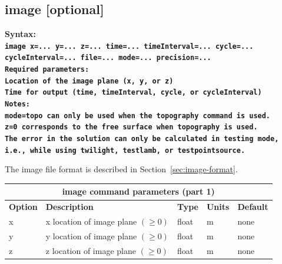 \documentclass[11pt]{report}
\begin{document}
\subsection{image [optional]}
\label{keyword:image}
\begin{flushleft}
\bf Syntax:\\ \tt image x=... y=... z=...
time=... timeInterval=... cycle=... cycleInterval=... file=... mode=... precision=...\\ \bf Required
parameters:\\ \rm Location of the image plane (x, y, or z) \\ Time for output (time, timeInterval,
cycle, or cycleInterval)\\ \bf Notes: \\ \rm \verb+mode=topo+ can only be used when the
\verb+topography+ command is used.\\ \verb+z=0+ corresponds to the free surface when
\verb+topography+ is used.\\ The error in the solution can only be calculated in testing mode, i.e.,
while using \verb+twilight+, \verb+testlamb+, or \verb+testpointsource+.
\end{flushleft}
%
The image file format is described in Section~\ref{sec:image-format}.
%
\begin{center}
\begin{tabular}{|l|p{8cm}|l|l|l|} \hline
\multicolumn{5}{|c|}{\bf image command parameters (part 1)}\\ \hline
\bf{Option} & \bf{Description}                             & \bf{Type} & \bf{Units} & \bf{Default} \\ 
\hline \hline
x          & x location of image plane  $(\geq 0)$    & float    & m        & none \\ \hline
y          & y location of image plane  $(\geq 0)$    & float    & m        & none \\ \hline
z          & z location of image plane  $(\geq 0)$    & float    & m        & none \\ \hline
\end{tabular}
\end{center}
\end{document}

